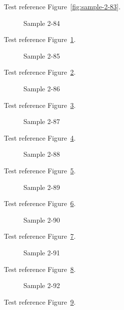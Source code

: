 Test reference Figure~\ref{fig:sample-2-83}.

\begin{figure}[tbhp]
\caption{Sample 2-84}
\label{fig:sample-2-84}
\end{figure}

Test reference Figure~\ref{fig:sample-2-84}.

\begin{figure}[tbhp]
\caption{Sample 2-85}
\label{fig:sample-2-85}
\end{figure}

Test reference Figure~\ref{fig:sample-2-85}.

\begin{figure}[tbhp]
\caption{Sample 2-86}
\label{fig:sample-2-86}
\end{figure}

Test reference Figure~\ref{fig:sample-2-86}.

\begin{figure}[tbhp]
\caption{Sample 2-87}
\label{fig:sample-2-87}
\end{figure}

Test reference Figure~\ref{fig:sample-2-87}.

\begin{figure}[tbhp]
\caption{Sample 2-88}
\label{fig:sample-2-88}
\end{figure}

Test reference Figure~\ref{fig:sample-2-88}.

\begin{figure}[tbhp]
\caption{Sample 2-89}
\label{fig:sample-2-89}
\end{figure}

Test reference Figure~\ref{fig:sample-2-89}.

\begin{figure}[tbhp]
\caption{Sample 2-90}
\label{fig:sample-2-90}
\end{figure}

Test reference Figure~\ref{fig:sample-2-90}.

\begin{figure}[tbhp]
\caption{Sample 2-91}
\label{fig:sample-2-91}
\end{figure}

Test reference Figure~\ref{fig:sample-2-91}.

\begin{figure}[tbhp]
\caption{Sample 2-92}
\label{fig:sample-2-92}
\end{figure}

Test reference Figure~\ref{fig:sample-2-92}.

